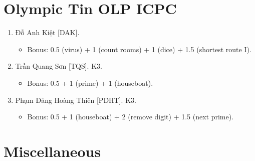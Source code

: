 \documentclass{article}
\begin{document}

\section{Olympic Tin OLP ICPC}

\begin{enumerate}
	\item {\sc Đỗ Anh Kiệt [DAK].}
	\begin{itemize}
		\item Bonus: 0.5 (virus) + 1 (count rooms) + 1 (dice) + 1.5 (shortest route I).
	\end{itemize}
	\item {\sc Trần Quang Sơn [TQS].} K3.
	\begin{itemize}
		\item Bonus: 0.5 + 1 (prime) + 1 (houseboat).
	\end{itemize}
	\item {\sc Phạm Đăng Hoàng Thiên [PDHT].} K3.
		\begin{itemize}
		\item Bonus: 0.5 + 1 (houseboat) + 2 (remove digit) + 1.5 (next prime).
	\end{itemize}
\end{enumerate}


\section{Miscellaneous}


\printbibliography[heading=bibintoc]
	
\end{document}
